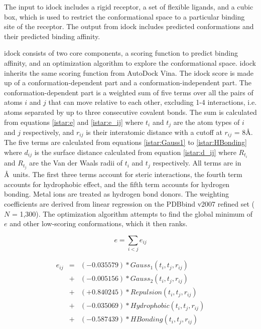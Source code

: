 The input to idock includes a rigid receptor, a set of flexible ligands, and a cubic box, which is used to restrict the conformational space to a particular binding site of the receptor. The output from idock includes predicted conformations and their predicted binding affinity.

idock consists of two core components, a scoring function to predict binding affinity, and an optimization algorithm to explore the conformational space. idock inherits the same scoring function from AutoDock Vina. The idock score is made up of a conformation-dependent part and a conformation-independent part. The conformation-dependent part is a weighted sum of five terms over all the pairs of atoms $i$ and $j$ that can move relative to each other, excluding 1-4 interactions, i.e. atoms separated by up to three consecutive covalent bonds. The sum is calculated from equations \eqref{istar:e} and \eqref{istar:e_ij} where $t_i$ and $t_j$ are the atom types of $i$ and $j$ respectively, and $r_{ij}$ is their interatomic distance with a cutoff at $r_{ij}$ = 8\AA. The five terms are calculated from equations \eqref{istar:Gauss1} to \eqref{istar:HBonding} where $d_{ij}$ is the surface distance calculated from equation \eqref{istar:d_ij} where $R_{t_i}$ and $R_{t_j}$ are the Van der Waals radii of $t_i$ and $t_j$ respectively. All terms are in \AA\ units. The first three terms account for steric interactions, the fourth term accounts for hydrophobic effect, and the fifth term accounts for hydrogen bonding. Metal ions are treated as hydrogen bond donors. The weighting coefficients are derived from linear regression on the PDBbind \citep{529,530} v2007 refined set ($N$ = 1,300). The optimization algorithm attempts to find the global minimum of $e$ and other low-scoring conformations, which it then ranks.

\begin{equation}
\label{istar:e}
e = \sum_{i < j} e_{ij}
\end{equation}

\begin{eqnarray}
\label{istar:e_ij}
e_{ij} &=& (-0.035579) * Gauss_1(t_i, t_j, r_{ij}) \nonumber \\
       &+& (-0.005156) * Gauss_2(t_i, t_j, r_{ij}) \nonumber \\
       &+& (+0.840245) * Repulsion(t_i, t_j, r_{ij}) \nonumber \\
       &+& (-0.035069) * Hydrophobic(t_i, t_j, r_{ij}) \nonumber \\
       &+& (-0.587439) * HBonding(t_i, t_j, r_{ij})
\end{eqnarray}

